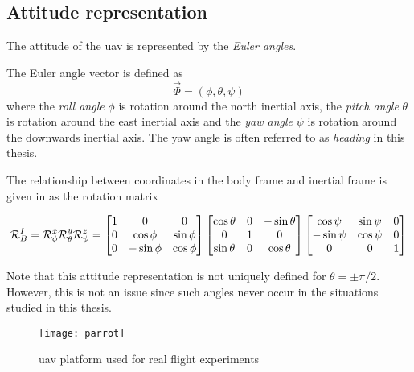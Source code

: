 \subsection{Attitude representation}
The attitude of the \ac{uav} is represented by the \textit{Euler angles}. 

\begin{definition}
The Euler angle vector is defined as
\begin{equation}
    \vec{\Phi}=(\phi, \theta, \psi)
\end{equation}
where the \textit{roll angle} $\phi$ is rotation around the north inertial axis, 
the \textit{pitch angle} $\theta$ is rotation around the east inertial axis and
the \textit{yaw angle} $\psi$ is rotation around the downwards inertial axis. The yaw angle is often 
referred to as \textit{heading} in this thesis.

The relationship between coordinates in the body frame and inertial frame is given
in \cite{sensor_fusion} as the rotation matrix 

\begin{equation}\label{eq:r_i_b}
\mathcal{R}^I_B = \mathcal{R}^x_\phi\mathcal{R}^y_\theta\mathcal{R}^z_\psi\\
=
\begin{bmatrix}
    1 & 0 & 0 \\
    0 & \cos\phi & \sin\phi \\
    0 & -\sin\phi & \cos\phi
\end{bmatrix}
\begin{bmatrix}
    \cos\theta & 0 & -\sin\theta \\
    0 & 1 & 0 \\
    \sin\theta & 0 & \cos\theta
\end{bmatrix}      
\begin{bmatrix}
    \cos\psi & \sin\psi & 0 \\
    -\sin\psi & \cos\psi & 0 \\
    0 & 0 & 1
\end{bmatrix}
\end{equation}  
\end{definition}

Note that this attitude representation is not uniquely defined for $\theta=\pm\pi/2$. However, this is not an issue since such angles 
never occur in the situations studied in this thesis.
\begin{figure}
    \centering
    \texttt{[image: parrot]}
    \caption{\ac{uav} platform used for real flight experiments}
    \label{fig:parrot}
\end{figure}
